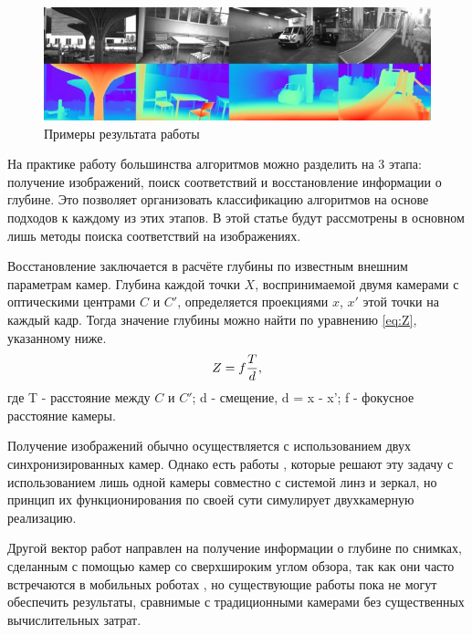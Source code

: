 \begin{figure}[H]
	\begin{center}
		\includegraphics[scale=0.7]{pics/exmpl.jpg}
		\caption{Примеры результата работы} 
		\label{pic:depth} %
	\end{center}
\end{figure}

На практике работу большинства алгоритмов можно разделить на 3 этапа: получение изображений, поиск соответствий и восстановление информации о глубине. Это позволяет
организовать классификацию алгоритмов на основе подходов к каждому из этих этапов. В этой статье будут рассмотрены в основном лишь методы поиска соответствий на изображениях. 

Восстановление заключается в расчёте глубины по известным внешним параметрам камер. Глубина каждой точки $X$, воспринимаемой двумя камерами 
с оптическими центрами $C$ и $C'$, определяется проекциями $x$, $x'$ этой точки на каждый кадр. Тогда значение глубины можно найти по уравнению \ref{eq:Z}, указанному ниже. 
\begin{equation}	
	Z = f{T \over d},
	\label{eq:Z}
\end{equation}
где T - расстояние между $C$ и $C'$;
    d - смещение,  {d = x - x'};
	f - фокусное расстояние камеры.

Получение изображений обычно осуществляется с использованием двух синхронизированных камер. Однако есть работы \cite{singlecamrev,singlecam}, которые 
решают эту задачу с использованием лишь одной камеры совместно с системой линз и зеркал, но принцип их функционирования по своей сути 
 симулирует двухкамерную реализацию. 
 
 Другой вектор работ направлен на получение информации о глубине по снимках, сделанным с помощью камер со сверхшироким 
 углом обзора, так как они часто встречаются в мобильных роботах \cite{omnifisheye,roxas2019realtime}, но существующие работы пока не могут обеспечить результаты, 
 сравнимые с традиционными камерами без существенных вычислительных затрат. 

